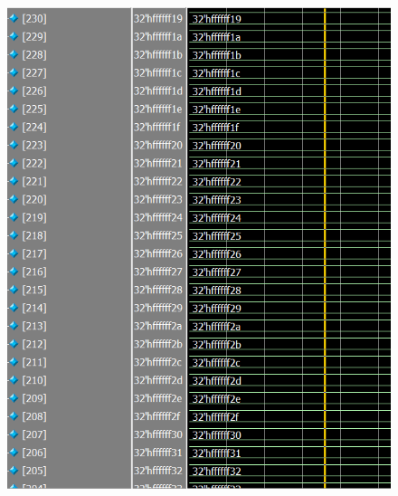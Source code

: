 \documentclass[conference]{IEEEtran}
\begin{document}
	\begin{figure}[H]
		\centering
		\includegraphics[width=\columnwidth]{Files/full_mem_val1}
		\caption{}
		\label{fig:fullmemval1}
	\end{figure}
	
\end{document}
